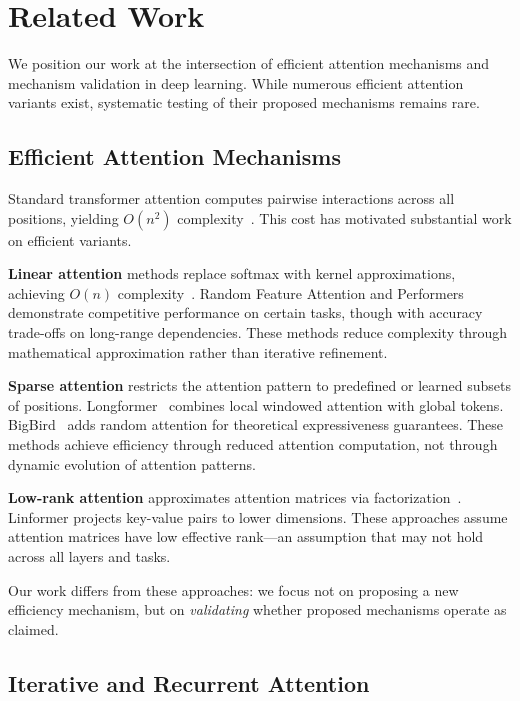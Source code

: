 \section{Related Work}
\label{sec:related}

We position our work at the intersection of efficient attention mechanisms and mechanism validation in deep learning. While numerous efficient attention variants exist, systematic testing of their proposed mechanisms remains rare.

\subsection{Efficient Attention Mechanisms}

Standard transformer attention computes pairwise interactions across all positions, yielding $O(n^2)$ complexity~\cite{vaswani2017attention}. This cost has motivated substantial work on efficient variants.

\textbf{Linear attention} methods replace softmax with kernel approximations, achieving $O(n)$ complexity~\cite{katharopoulos2020transformers,choromanski2021rethinking}. Random Feature Attention and Performers demonstrate competitive performance on certain tasks, though with accuracy trade-offs on long-range dependencies. These methods reduce complexity through mathematical approximation rather than iterative refinement.

\textbf{Sparse attention} restricts the attention pattern to predefined or learned subsets of positions. Longformer~\cite{beltagy2020longformer} combines local windowed attention with global tokens. BigBird~\cite{zaheer2020big} adds random attention for theoretical expressiveness guarantees. These methods achieve efficiency through reduced attention computation, not through dynamic evolution of attention patterns.

\textbf{Low-rank attention} approximates attention matrices via factorization~\cite{wang2020linformer}. Linformer projects key-value pairs to lower dimensions. These approaches assume attention matrices have low effective rank---an assumption that may not hold across all layers and tasks.

Our work differs from these approaches: we focus not on proposing a new efficiency mechanism, but on \emph{validating} whether proposed mechanisms operate as claimed.

\subsection{Iterative and Recurrent Attention}


